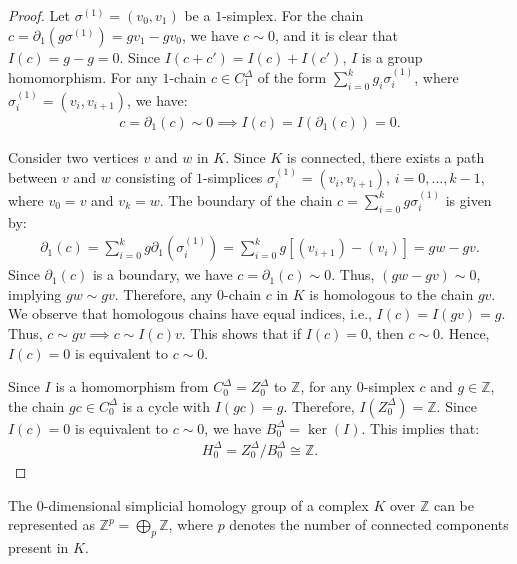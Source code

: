 \begin{proof}
	Let \( \sigma^{(1)} = (v_{0}, v_{1}) \) be a \( 1 \)-simplex. For the chain \( c = \partial_{1}(g \sigma^{(1)}) = g v_{1} - g v_{0} \), we have \( c \sim 0 \), and it is clear that \( I(c) = g - g = 0 \). Since \( I(c + c') = I(c) + I(c') \), \( I \) is a group homomorphism. For any \( 1 \)-chain \( c \in C^{\Delta}_{1} \) of the form \( \sum_{i=0}^{k} g_{i} \sigma_{i}^{(1)} \), where \( \sigma_{i}^{(1)} = (v_{i}, v_{i+1}) \), we have:
	\begin{align}
		c = \partial_{1}(c) \sim 0 \implies I(c) = I(\partial_{1}(c)) = 0. 
	\end{align}
				
	Consider two vertices \( v \) and \( w \) in \( K \). Since \( K \) is connected, there exists a path between \( v \) and \( w \) consisting of \( 1 \)-simplices \( \sigma_{i}^{(1)} = (v_{i}, v_{i+1}) \), \( i = 0, \ldots, k-1 \), where \( v_{0} = v \) and \( v_{k} = w \). The boundary of the chain \( c = \sum_{i=0}^{k} g \sigma_{i}^{(1)} \) is given by:
	\begin{align}
		\partial_{1}(c) = \sum_{i=0}^{k} g \partial_{1}(\sigma_{i}^{(1)}) = \sum_{i=0}^{k} g [(v_{i+1}) - (v_{i})] = g w - g v. 
	\end{align}
	Since \( \partial_{1}(c) \) is a boundary, we have \( c = \partial_{1}(c) \sim 0 \). Thus, \( (g w - g v) \sim 0 \), implying \( g w \sim g v \). Therefore, any \( 0 \)-chain \( c \) in \( K \) is homologous to the chain \( g v \). We observe that homologous chains have equal indices, i.e., \( I(c) = I(g v) = g \). Thus, \( c \sim g v \implies c \sim I(c) v \). This shows that if \( I(c) = 0 \), then \( c \sim 0 \). Hence, \( I(c) = 0 \) is equivalent to \( c \sim 0 \).
				
	Since \( I \) is a homomorphism from \( C^{\Delta}_{0} = Z^{\Delta}_{0} \) to \( \mathbb{Z} \), for any \( 0 \)-simplex \( c \) and \( g \in \mathbb{Z} \), the chain \( g c \in C^{\Delta}_{0} \) is a cycle with \( I(g c) = g \). Therefore, \( I(Z^{\Delta}_{0}) = \mathbb{Z} \). Since \( I(c) = 0 \) is equivalent to \( c \sim 0 \), we have \( B^{\Delta}_{0} = \ker(I) \). This implies that:
	\begin{align}
		H^{\Delta}_{0} = Z^{\Delta}_{0} / B^{\Delta}_{0} \cong \mathbb{Z}. 
	\end{align}
\end{proof}

\begin{corollary}
	\label{directsum0hom}
	The $0$-dimensional simplicial homology group of a complex \( K \) over \( \mathbb{Z} \) can be represented as \( \mathbb{Z}^{p} = \bigoplus_{p} \mathbb{Z} \), where \( p \) denotes the number of connected components present in \( K \).
\end{corollary}

